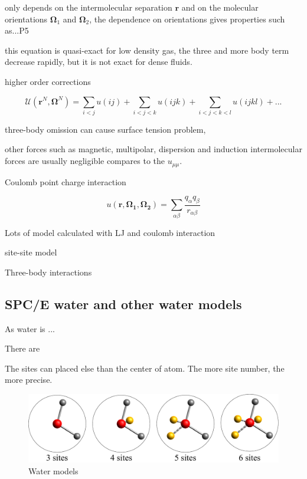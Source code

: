 only depends on the intermolecular separation $\mathbf{r}$ and on
the molecular orientations $\mathbf{\Omega}_{1}$ and $\mathbf{\Omega}_{2}$,
the dependence on orientations gives properties such as...P5

this equation is quasi-exact for low density gas, the three and more
body term decrease rapidly, but it is not exact for dense fluids.

higher order corrections

\[
\mathcal{U}(\mathbf{r}^{N},\mathbf{\Omega}^{N})=\sum_{i<j}u(ij)+\sum_{i<j<k}u(ijk)+\sum_{i<j<k<l}u(ijkl)+...
\]


three-body omission can cause surface tension problem, 

other forces such as magnetic, multipolar, dispersion and induction
intermolecular forces are usually negligible compares to the $u_{\mu\mu}$. 

Coulomb point charge interaction

\begin{equation}
u(\mathbf{r},\mathbf{\Omega_{1}},\mathbf{\Omega_{2}})=\sum_{\alpha\beta}\frac{q_{\alpha}q_{\beta}}{r_{\alpha\beta}}
\end{equation}


Lots of model calculated with LJ and coulomb interaction 

site-site model

Three-body interactions


\subsection{SPC/E water and other water models}

As water is ...

There are 

The sites can placed else than the center of atom. The more site number,
the more precise.

\begin{figure}[h]
\begin{centering}
\includegraphics[width=0.75\columnwidth]{_figure/water}
\par\end{centering}

\caption{Water models\label{fig:Water-models}}
\end{figure}


